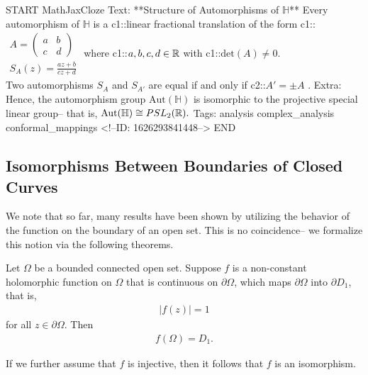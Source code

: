 \documentclass{memoir}
\begin{document}
\begin{anki}
START
MathJaxCloze
Text: **Structure of Automorphisms of \(\mathbb{H}\)**
Every automorphism of \(\mathbb{H}\) is a {{c1::linear fractional translation}} of the form
{{c1::\(\begin{align*}
        	A = \begin{pmatrix} a & b \\ c & d \end{pmatrix} \\
        	S_A(z) =\frac{az+b}{c z + d}
        \end{align*}\)}}
where {{c1::\(a,b,c,d \in \mathbb{R}\)}} with {{c1::\(\textrm{det}(A)\neq 0\)}}.\\

Two automorphisms \(S_A\) and \(S_{A'}\) are equal if and only if {{c2::\(A' = \pm A\)}} .
Extra: Hence, the automorphism group \(\textrm{Aut}(\mathbb{H})\) is isomorphic to the projective special linear group-- that is,
\( \begin{align*}
  	 \textrm{Aut}(\mathbb{H}) \cong PSL_2(\mathbb{R}).
  \end{align*}\)
Tags: analysis complex_analysis conformal_mappings
<!--ID: 1626293841448-->
END
\end{anki}


\subsection{Isomorphisms Between Boundaries of Closed Curves}
\label{sub:isomorphisms_between_boundaries_of_closed_curves}

We note that so far, many results have been shown by utilizing the behavior of the function on the boundary of an open set. This is no coincidence-- we formalize this notion via the following theorems.

\begin{thm}
	Let \(\Omega \) be a bounded connected open set. Suppose \(f\) is a non-constant holomorphic function on \(\Omega \) that is continuous on \(\partial\Omega \), which maps \(\partial\Omega \) into \(\partial D_1\), that is,
	\begin{align*}
		\left| f(z) \right| =1
	\end{align*}
	for all \(z \in \partial\Omega \). Then
	\begin{align*}
		f(\Omega ) = D_1.
	\end{align*}
\end{thm}
If we further assume that \(f\) is injective, then it follows that \(f\) is an isomorphism.
\end{document}
